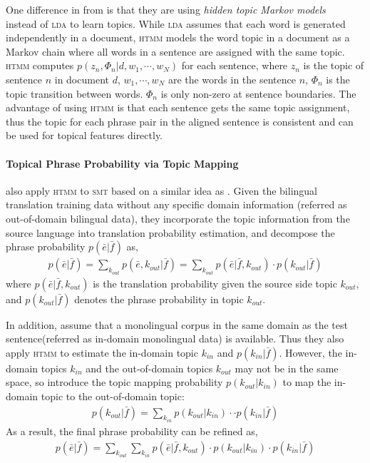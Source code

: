 One difference in \citet{hasler-12} from \citet{Eidelman-12} is that
they are using \emph{hidden topic Markov
  models}~\citep[\textsc{htmm}]{gruber-07} instead of \textsc{lda} to
learn topics. While \textsc{lda} assumes that each word is generated
independently in a document, \textsc{htmm} models the word topic in a
document as a Markov chain where all words in a sentence are assigned
with the same topic. \textsc{htmm} computes $p(z_n, \Phi_n | d, w_1,
\cdots, w_N)$ for each sentence, where $z_n$ is the topic of sentence
$n$ in document $d$, $w_1, \cdots, w_N$ are the words in the sentence
$n$, $\Phi_n$ is the topic transition between words. $\Phi_n$ is only
non-zero at sentence boundaries. The advantage of using \textsc{htmm}
is that each sentence gets the same topic assignment, thus the topic
for each phrase pair in the aligned sentence is consistent and can be
used for topical features directly.


\paragraph{Topical Phrase Probability via Topic Mapping}

\citet{su-12} also apply \textsc{htmm} to \textsc{smt} based on a
similar idea as \citet{Eidelman-12}. Given the bilingual translation
training data without any specific domain information (referred as
out-of-domain bilingual data), they incorporate the topic information
from the source language into translation probability estimation, and
decompose the phrase probability $p(\bar{e}|\bar{f})$ as,
\begin{align}
p(\bar{e}|\bar{f}) = \sum_{k_{out}} p(\bar{e}, k_{out} | \bar{f}) = \sum_{k_{out}} p(\bar{e} | \bar{f}, k_{out}) \cdot p(k_{out} | \bar{f})
\end{align}
where $p(\bar{e} | \bar{f}, k_{out})$ is the translation probability given the source side topic $k_{out}$, and $p(k_{out} | \bar{f})$ denotes the phrase probability in topic $k_{out}$.

In addition, \citet{su-12} assume that a monolingual corpus in the
same domain as the test sentence(referred as in-domain monolingual
data) is available. Thus they also apply \textsc{htmm} to estimate the
in-domain topic $k_{in}$ and $p(k_{in} | \bar{f})$.  However, the
in-domain topics $k_{in}$ and the out-of-domain topics $k_{out}$ may
not be in the same space, so \citet{su-12} introduce the topic mapping
probability $p(k_{out} | k_{in})$ to map the in-domain topic to the
out-of-domain topic:
\begin{align}
p(k_{out} | \bar{f}) = \sum_{k_{in}} p(k_{out} | k_{in}) \cdot \cdot p(k_{in} | \bar{f})
\end{align}
As a result, the final phrase probability can be refined as,
\begin{align}
p(\bar{e}|\bar{f}) = \sum_{k_{out}} \sum_{k_{in}} p(\bar{e} | \bar{f}, k_{out}) \cdot p(k_{out} | k_{in}) \cdot p(k_{in} | \bar{f})
\end{align}


